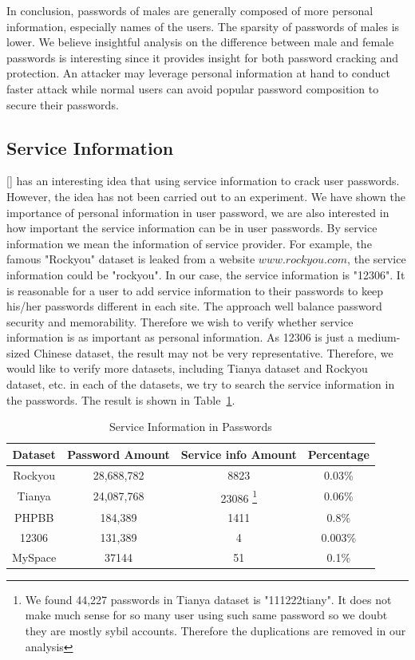 \documentclass{sig-alternate}
\begin{document}
In conclusion, passwords of males are generally composed of more personal information, especially names of the users. The sparsity of passwords of males is lower. We believe insightful analysis on the difference between male and female passwords is interesting since it provides insight for both password cracking and protection. An attacker may leverage personal information at hand to conduct faster attack while normal users can avoid popular password composition to secure their passwords.


\subsection{Service Information} 
[] has an interesting idea that using service information to crack user passwords. However, the idea has not been carried out to an experiment. We have shown the importance of personal information in user password, we are also interested in how important the service information can be in user passwords. By service information we mean the information of service provider. For example, the famous "Rockyou" dataset is leaked from a website $www.rockyou.com$, the service information could be "rockyou". In our case, the service information is "12306". It is reasonable for a user to add service information to their passwords to keep his/her passwords different in each site. The approach well balance password security and memorability. Therefore we wish to verify whether service information is as important as personal information. As 12306 is just a medium-sized Chinese dataset, the result may not be very representative. Therefore, we would like to verify more datasets, including Tianya dataset and Rockyou dataset, etc. in each of the datasets, we try to search the service information in the passwords. The result is shown in Table~\ref{t7}.

\begin{table}[!]
\centering
\caption{Service Information in Passwords}
\begin{adjustbox}{max width=0.48\textwidth}
\begin{tabular}{|c|c|c|c|} \hline
Dataset & Password Amount & Service info Amount & Percentage\\ \hline
Rockyou & 28,688,782 & 8823& 0.03\%\\ 
Tianya & 24,087,768 & 23086{ \footnote{We found 44,227 passwords in Tianya dataset is "111222tiany". It does not make much sense for so many user using such same password so we doubt they are mostly sybil accounts. Therefore the duplications are removed in our analysis} } &0.06\%\\ 
PHPBB & 184,389 & 1411 & 0.8\%\\ 
12306 & 131,389 & 4 & 0.003\%\\ 
MySpace & 37144 & 51 & 0.1\%\\ 
\hline\end{tabular}
\end{adjustbox}
\label{t7}
\end{table}
\end{document}
